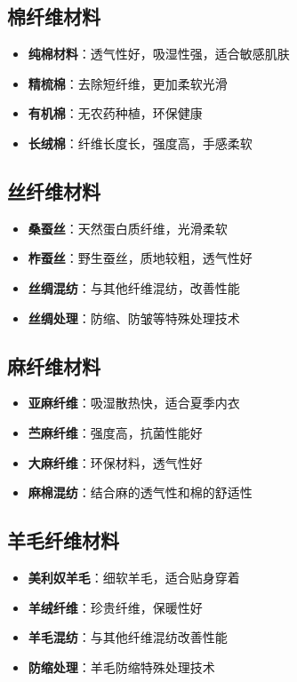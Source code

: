 \documentclass[12pt,UTF8]{ctexbook}
\begin{document}
\subsection{棉纤维材料}
\begin{itemize}[leftmargin=2cm]
	\item \textbf{纯棉材料}：透气性好，吸湿性强，适合敏感肌肤
	\item \textbf{精梳棉}：去除短纤维，更加柔软光滑
	\item \textbf{有机棉}：无农药种植，环保健康
	\item \textbf{长绒棉}：纤维长度长，强度高，手感柔软
\end{itemize}

\subsection{丝纤维材料}
\begin{itemize}[leftmargin=2cm]
	\item \textbf{桑蚕丝}：天然蛋白质纤维，光滑柔软
	\item \textbf{柞蚕丝}：野生蚕丝，质地较粗，透气性好
	\item \textbf{丝绸混纺}：与其他纤维混纺，改善性能
	\item \textbf{丝绸处理}：防缩、防皱等特殊处理技术
\end{itemize}

\subsection{麻纤维材料}
\begin{itemize}[leftmargin=2cm]
	\item \textbf{亚麻纤维}：吸湿散热快，适合夏季内衣
	\item \textbf{苎麻纤维}：强度高，抗菌性能好
	\item \textbf{大麻纤维}：环保材料，透气性好
	\item \textbf{麻棉混纺}：结合麻的透气性和棉的舒适性
\end{itemize}

\subsection{羊毛纤维材料}
\begin{itemize}[leftmargin=2cm]
	\item \textbf{美利奴羊毛}：细软羊毛，适合贴身穿着
	\item \textbf{羊绒纤维}：珍贵纤维，保暖性好
	\item \textbf{羊毛混纺}：与其他纤维混纺改善性能
	\item \textbf{防缩处理}：羊毛防缩特殊处理技术
\end{itemize}
\end{document}
